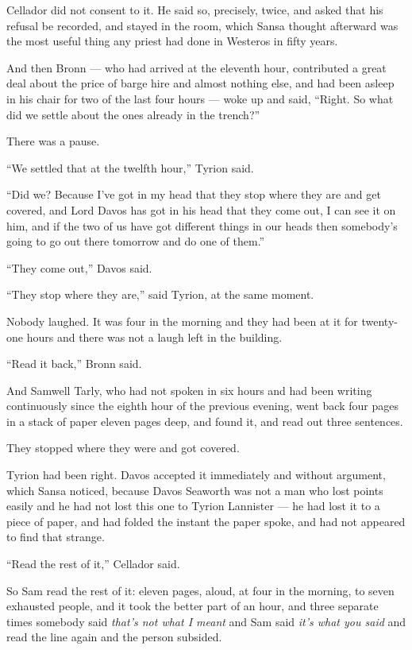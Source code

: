 Cellador did not consent to it. He said so, precisely, twice, and asked that his refusal be recorded, and stayed in the room, which Sansa thought afterward was the most useful thing any priest had done in Westeros in fifty years.

And then Bronn — who had arrived at the eleventh hour, contributed a great deal about the price of barge hire and almost nothing else, and had been asleep in his chair for two of the last four hours — woke up and said, “Right. So what did we settle about the ones already in the trench?”

There was a pause.

“We settled that at the twelfth hour,” Tyrion said.

“Did we? Because I’ve got in my head that they stop where they are and get covered, and Lord Davos has got in his head that they come out, I can see it on him, and if the two of us have got different things in our heads then somebody’s going to go out there tomorrow and do one of them.”

“They come out,” Davos said.

“They stop where they are,” said Tyrion, at the same moment.

Nobody laughed. It was four in the morning and they had been at it for twenty-one hours and there was not a laugh left in the building.

“Read it back,” Bronn said.

And Samwell Tarly, who had not spoken in six hours and had been writing continuously since the eighth hour of the previous evening, went back four pages in a stack of paper eleven pages deep, and found it, and read out three sentences.

They stopped where they were and got covered.

Tyrion had been right. Davos accepted it immediately and without argument, which Sansa noticed, because Davos Seaworth was not a man who lost points easily and he had not lost this one to Tyrion Lannister — he had lost it to a piece of paper, and had folded the instant the paper spoke, and had not appeared to find that strange.

“Read the rest of it,” Cellador said.

So Sam read the rest of it: eleven pages, aloud, at four in the morning, to seven exhausted people, and it took the better part of an hour, and three separate times somebody said \textit{that’s not what I meant} and Sam said \textit{it’s what you said} and read the line again and the person subsided.

